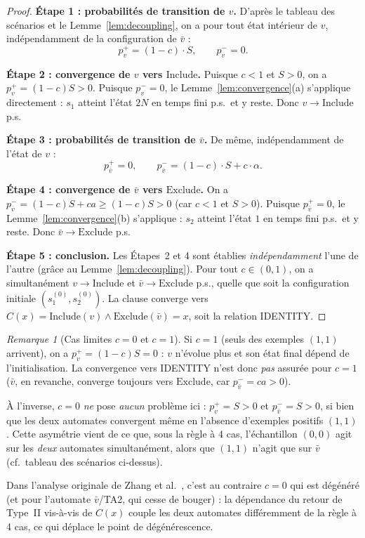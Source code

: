 \documentclass[12pt,a4paper]{article}
\theoremstyle{remark}
\newtheorem{remark}{Remarque}[section]
\newcommand{\Inc}{\ensuremath{\mathrm{Include}}}
\newcommand{\Exc}{\ensuremath{\mathrm{Exclude}}}
\newcommand{\vbar}{\bar{v}}
\begin{document}
\begin{proof}
\textbf{Étape 1 : probabilités de transition de $v$.}
D'après le tableau des scénarios et le Lemme~\ref{lem:decoupling},
on a pour tout état intérieur de $v$, indépendamment de la configuration de $\vbar$ :
\[
  p^+_v = (1-c)\cdot S, \qquad p^-_v = 0.
\]

\textbf{Étape 2 : convergence de $v$ vers \Inc.}
Puisque $c < 1$ et $S > 0$, on a $p^+_v = (1-c)S > 0$.
Puisque $p^-_v = 0$, le Lemme~\ref{lem:convergence}(a) s'applique directement :
$s_1$ atteint l'état $2N$ en temps fini p.s.\ et y reste.  Donc $v \to \Inc$ p.s.

\textbf{Étape 3 : probabilités de transition de $\vbar$.}
De même, indépendamment de l'état de $v$ :
\[
  p^+_{\vbar} = 0, \qquad p^-_{\vbar} = (1-c)\cdot S + c\cdot \alpha.
\]

\textbf{Étape 4 : convergence de $\vbar$ vers \Exc.}
On a $p^-_{\vbar} = (1-c)S + ca \ge (1-c)S > 0$
(car $c < 1$ et $S > 0$).
Puisque $p^+_{\vbar} = 0$, le Lemme~\ref{lem:convergence}(b) s'applique :
$s_2$ atteint l'état $1$ en temps fini p.s.\ et y reste.  Donc $\vbar \to \Exc$ p.s.

\textbf{Étape 5 : conclusion.}
Les Étapes~2 et 4 sont établies \emph{indépendamment} l'une de l'autre
(grâce au Lemme~\ref{lem:decoupling}).  Pour tout $c \in (0,1)$, on a
simultanément $v \to \Inc$ et $\vbar \to \Exc$ p.s.,
quelle que soit la configuration initiale $(s_1^{(0)}, s_2^{(0)})$.
La clause converge vers $C(x) = \Inc(v) \wedge \Exc(\vbar) = x$,
soit la relation IDENTITY.
\end{proof}

\begin{remark}[Cas limites $c = 0$ et $c = 1$]
Si $c = 1$ (seuls des exemples $(1,1)$ arrivent), on a $p^+_v = (1-c)S = 0$ : $v$ n'évolue
plus et son état final dépend de l'initialisation.  La convergence vers IDENTITY n'est donc
\emph{pas} assurée pour $c = 1$ ($\vbar$, en revanche, converge toujours vers \Exc{}, car
$p^-_{\vbar} = ca > 0$).

À l'inverse, $c = 0$ \emph{ne} pose \emph{aucun} problème ici : $p^+_v = S > 0$ et
$p^-_{\vbar} = S > 0$, si bien que les deux automates convergent même en l'absence
d'exemples positifs $(1,1)$.  Cette asymétrie vient de ce que, sous la règle à 4 cas,
l'échantillon $(0,0)$ agit sur les \emph{deux} automates simultanément, alors que
$(1,1)$ n'agit que sur $\vbar$ (cf.\ tableau des scénarios ci-dessus).

Dans l'analyse originale de Zhang et al.\ \cite{zhang2021}, c'est au contraire $c=0$ qui
est dégénéré (et pour l'automate $\vbar$/TA2, qui cesse de bouger) : la dépendance du
retour de Type~II vis-à-vis de $C(x)$ couple les deux automates différemment de la règle
à 4 cas, ce qui déplace le point de dégénérescence.
\end{remark}
\end{document}

